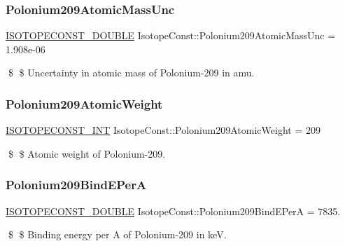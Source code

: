 \subsubsection{\texorpdfstring{Polonium209\+Atomic\+Mass\+Unc}{Polonium209AtomicMassUnc}}
{\footnotesize\ttfamily \mbox{\hyperlink{group___isotope_const-_macros_ga8f45a7272ce02c0b4c65c44636ed719a}{I\+S\+O\+T\+O\+P\+E\+C\+O\+N\+S\+T\+\_\+\+D\+O\+U\+B\+LE}} Isotope\+Const\+::\+Polonium209\+Atomic\+Mass\+Unc = 1.\+908e-\/06}

\$ \$ Uncertainty in atomic mass of Polonium-\/209 in amu. \mbox{\label{group___isotope_const-_polonium-_po209_ga0ce6f60b8584d1ac1f41060700b923db}} 
\subsubsection{\texorpdfstring{Polonium209\+Atomic\+Weight}{Polonium209AtomicWeight}}
{\footnotesize\ttfamily \mbox{\hyperlink{group___isotope_const-_macros_ga5f18360b3e99483a35c32d789e62621c}{I\+S\+O\+T\+O\+P\+E\+C\+O\+N\+S\+T\+\_\+\+I\+NT}} Isotope\+Const\+::\+Polonium209\+Atomic\+Weight = 209}

\$ \$ Atomic weight of Polonium-\/209. \mbox{\label{group___isotope_const-_polonium-_po209_ga9199bb60eceeb1e36f1721e7f78e9678}} 
\subsubsection{\texorpdfstring{Polonium209\+Bind\+E\+PerA}{Polonium209BindEPerA}}
{\footnotesize\ttfamily \mbox{\hyperlink{group___isotope_const-_macros_ga8f45a7272ce02c0b4c65c44636ed719a}{I\+S\+O\+T\+O\+P\+E\+C\+O\+N\+S\+T\+\_\+\+D\+O\+U\+B\+LE}} Isotope\+Const\+::\+Polonium209\+Bind\+E\+PerA = 7835.}

\$ \$ Binding energy per A of Polonium-\/209 in keV. \mbox{\label{group___isotope_const-_polonium-_po209_ga017f45bfb3cdfa1aca9f41a398567c38}} 
